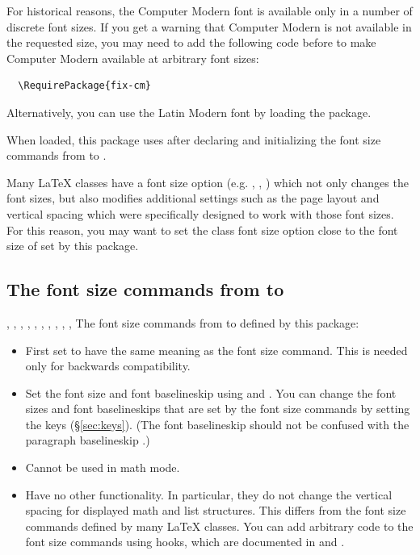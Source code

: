 \documentclass{beerydoc}
\begin{document}
For historical reasons, the Computer Modern font is available only in a number
of discrete font sizes.
If you get a warning that Computer Modern is not available in the requested
size, you may need to add the following code before  to make
Computer Modern available at arbitrary font sizes:
\begin{verbatim}
  \RequirePackage{fix-cm}
\end{verbatim}
Alternatively, you can use the Latin Modern font by loading the 
package.

When loaded, this package uses  after declaring and initializing
the font size commands from  to .

Many \LaTeX{} classes have a font size option (e.g. \key{10pt}, \key{11pt},
\key{12pt}) which not only changes the font sizes, but also modifies additional
settings such as the page layout and vertical spacing which were specifically
designed to work with those font sizes.
For this reason, you may want to set the class font size option close to the
font size of  set by this package.

\subsection{The font size commands from  to }
\label{subsec:names}

\begin{codedoc}
  {
    \tiny, \scriptsize, \footnotesize, \small, \normalsize,
    \large, \Large, \LARGE, \huge, \Huge,
    \@currsize
  }
  The font size commands from  to  defined by this package:
  \begin{itemize}
    \item
    First set  to have the same meaning as the font size command.
    This is needed only for backwards compatibility.
    \item
    Set the font size and font baselineskip using  and
    .
    You can change the font sizes and font baselineskips that are set by the
    font size commands by setting the  keys (\S\ref{sec:keys}).
    (The font baselineskip should not be confused with the paragraph
    baselineskip .)
    \item Cannot be used in math mode.
    \item
    Have no other functionality.
    In particular, they do not change the vertical spacing for displayed math
    and list structures.
    This differs from the font size commands defined by many \LaTeX{} classes.
    You can add arbitrary code to the font size commands using hooks, which are
    documented in  and .
  \end{itemize}
\end{codedoc}
\end{document}
